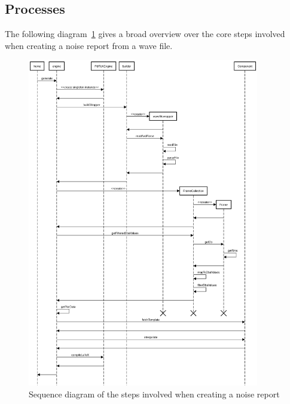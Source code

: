\clearpage

\subsection{Processes}
The following diagram~\ref{fig:sequence-diagram-noise-report} gives a broad overview over the core steps involved when creating a noise report from a wave file.

\begin{figure}[H]
    \centering
    \includegraphics[width=0.9\textwidth]{../assets/sequence_diagram_from_wave_file_to_pdf.png}
    \caption{Sequence diagram of the steps involved when creating a noise report}\label{fig:sequence-diagram-noise-report}
\end{figure}


